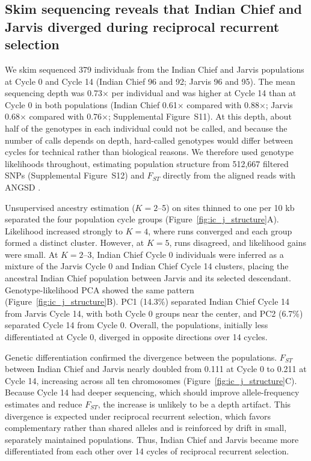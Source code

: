 \documentclass[namedate,unnumsec,webpdf,contemporary,large]{oup-authoring-template}
\begin{document}
\subsection{Skim sequencing reveals that Indian Chief and Jarvis diverged during reciprocal recurrent selection}

We skim sequenced 379 individuals from the Indian Chief and Jarvis populations at Cycle 0 and Cycle 14 (Indian Chief 96 and 92; Jarvis 96 and 95). The mean sequencing depth was 0.73$\times$ per individual and was higher at Cycle 14 than at Cycle 0 in both populations (Indian Chief 0.61$\times$ compared with 0.88$\times$; Jarvis 0.68$\times$ compared with 0.76$\times$; Supplemental Figure~S11). At this depth, about half of the genotypes in each individual could not be called, and because the number of calls depends on depth, hard-called genotypes would differ between cycles for technical rather than biological reasons. We therefore used genotype likelihoods throughout, estimating population structure from 512,667 filtered SNPs (Supplemental Figure~S12) and $F_{ST}$ directly from the aligned reads with ANGSD \citep{Korneliussen2014ANGSD}.

Unsupervised ancestry estimation ($K = 2$--5) on sites thinned to one per 10 kb separated the four population cycle groups (Figure~\ref{fig:ic_j_structure}A). Likelihood increased strongly to $K = 4$, where runs converged and each group formed a distinct cluster. However, at $K = 5$, runs disagreed, and likelihood gains were small. At $K = 2$--3, Indian Chief Cycle 0 individuals were inferred as a mixture of the Jarvis Cycle 0 and Indian Chief Cycle 14 clusters, placing the ancestral Indian Chief population between Jarvis and its selected descendant. Genotype-likelihood PCA showed the same pattern (Figure~\ref{fig:ic_j_structure}B). PC1 (14.3\%) separated Indian Chief Cycle 14 from Jarvis Cycle 14, with both Cycle 0 groups near the center, and PC2 (6.7\%) separated Cycle 14 from Cycle 0. Overall, the populations, initially less differentiated at Cycle 0, diverged in opposite directions over 14 cycles.

Genetic differentiation confirmed the divergence between the populations. $F_{ST}$ between Indian Chief and Jarvis nearly doubled from 0.111 at Cycle 0 to 0.211 at Cycle 14, increasing across all ten chromosomes (Figure~\ref{fig:ic_j_structure}C). Because Cycle 14 had deeper sequencing, which should improve allele-frequency estimates and reduce $F_{ST}$, the increase is unlikely to be a depth artifact. This divergence is expected under reciprocal recurrent selection, which favors complementary rather than shared alleles \citep{Comstock1949RRS} and is reinforced by drift in small, separately maintained populations. Thus, Indian Chief and Jarvis became more differentiated from each other over 14 cycles of reciprocal recurrent selection.
\end{document}
